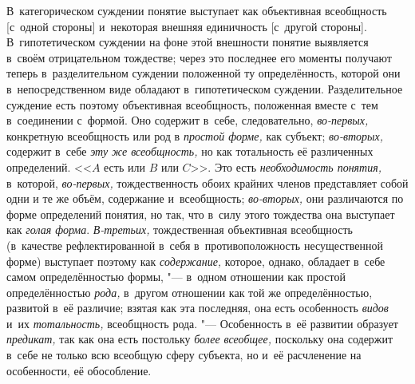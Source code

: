 В~категорическом суждении понятие выступает как объективная
всеобщность [с~одной стороны] и~некоторая внешняя единичность [с~другой
стороны]. В~гипотетическом суждении на фоне этой внешности понятие
выявляется в~своём отрицательном тождестве; через это последнее его моменты
получают теперь в~разделительном суждении положенной ту определённость,
которой они в~непосредственном виде обладают в~гипотетическом суждении.
Разделительное суждение есть поэтому объективная всеобщность, положенная
вместе с~тем в~соединении с~формой. Оно содержит в~себе, следовательно,
{\em во-первых,} конкретную всеобщность или род в {\em простой форме,} как
субъект; {\em во-вторых,} содержит в~себе {\em эту
же всеобщность,} но как тотальность её
различенных определений. <<$A$ есть или $B$ или $C$>>. Это есть
{\em необходимость понятия,} в~которой, {\em во-первых,}
тождественность обоих крайних членов представляет собой одни
и те же объём, содержание и~всеобщность;
{\em во-вторых,} они
различаются по форме определений понятия, но так, что в~силу этого
тождества она выступает как {\em голая
форма}. {\em В-третьих,}
тождественная объективная всеобщность (в~качестве
рефлектированной в~себя в~противоположность несущественной форме) выступает
поэтому как {\em содержание,}
которое, однако, обладает в~себе самом определённостью
формы, "--- в~одном отношении как простой определённостью
{\em рода,} в~другом
отношении как той же определённостью, развитой в~её различие; взятая как
эта последняя, она есть особенность {\em видов} и~их {\em тотальность,}
всеобщность рода. "--- Особенность в~её развитии
образует {\em предикат,} так как она есть постольку {\em более всеобщее,}
поскольку она содержит в~себе не только всю всеобщую сферу
субъекта, но и~её расчленение на особенности, её обособление.

